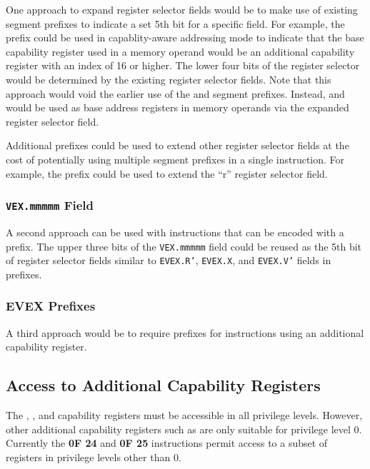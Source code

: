 One approach to expand register selector fields would be to make use
of existing segment prefixes to indicate a set 5th bit for a specific
field.  For example, the \GS{} prefix could be used in capablity-aware
addressing mode to indicate that the base capability register used in
a memory operand would be an additional capability register with an
index of 16 or higher.  The lower four bits of the register selector
would be determined by the existing register selector fields.   Note
that this approach would void the earlier use of the \FS{} and \GS{}
segment prefixes.  Instead, \CFS{} and \CGS{} would be used as base
address registers in memory operands via the expanded register
selector field.

Additional prefixes could be used to extend other register selector
fields at the cost of potentially using multiple segment prefixes in a
single instruction.  For example, the \FS{} prefix could be used to
extend the ``r'' register selector field.

\subsubsection{\texttt{VEX.mmmmm} Field}

A second approach can be used with instructions that can be encoded
with a \VEX{} prefix.  The upper three bits of the \texttt{VEX.mmmmm}
field could be reused as the 5th bit of register selector fields
similar to \texttt{EVEX.R'}, \texttt{EVEX.X}, and \texttt{EVEX.V'}
fields in \EVEX{} prefixes.

\subsubsection{EVEX Prefixes}

A third approach would be to require \EVEX{} prefixes for instructions
using an additional capability register.

\subsection{Access to Additional Capability Registers}

The \CFS{}, \CGS{}, and \DDC{} capability registers must be accessible
in all privilege levels.  However, other additional capability
registers such as \KGS{} are only suitable for privilege level 0.
Currently the \textbf{0F 24} and \textbf{0F 25} instructions permit
access to a subset of registers in privilege levels other than 0.

